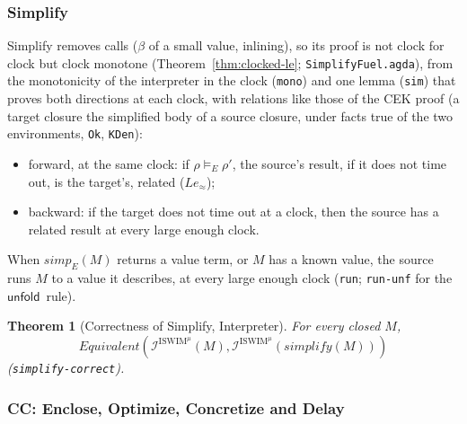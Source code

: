 \documentclass[10pt]{article}
\theoremstyle{acmplain}
\newtheorem{theorem}{Theorem}[section]
\newcommand{\key}[1]{\mathsf{#1}}
\newcommand{\pass}[1]{\mathit{#1}}
\newcommand{\Equiv}{\mathit{Equivalent}}
\newcommand{\Interp}[1]{\mathcal{I}^{#1}}
\newcommand{\Ml}[1]{\textrm{#1}^{\mu}}                  %
\newcommand{\Munfold}{\key{unfold}\,}
\begin{document}
\subsubsection{Simplify}

Simplify removes calls ($\beta$ of a small value, inlining), so its proof
is not clock for clock but clock monotone (Theorem~\ref{thm:clocked-le};
\texttt{SimplifyFuel.agda}), from the monotonicity of the interpreter in
the clock (\texttt{mono}) and one lemma (\texttt{sim}) that proves both directions at each clock,
with relations like those of the CEK proof (a target closure the
simplified body of a source closure, under facts true of the two
environments, \texttt{Ok}, \texttt{KDen}):
\begin{itemize}
\item forward, at the same clock: if $\rho \models_E \rho'$, the
  source's result, if it does not time out, is the target's, related
  ($\mathit{Le}_{\approx}$);
\item backward: if the target does not time out at a clock, then the
  source has a related result at every large enough clock.
\end{itemize}
When $\pass{simp}_E(M)$ returns a value term, or $M$ has a known value,
the source runs $M$ to a value it describes, at every large enough clock
(\texttt{run}; \texttt{run-unf} for the
$\Munfold$ rule).
\begin{theorem}[Correctness of Simplify, Interpreter]\label{thm:m-interp-simplify}
For every closed $M$,
\[ \Equiv(\Interp{\Ml{ISWIM}}(M), \Interp{\Ml{ISWIM}}(\pass{simplify}(M))) \]
(\texttt{simplify-correct}).
\end{theorem}

\subsubsection{CC: Enclose, Optimize, Concretize and Delay}
\end{document}
